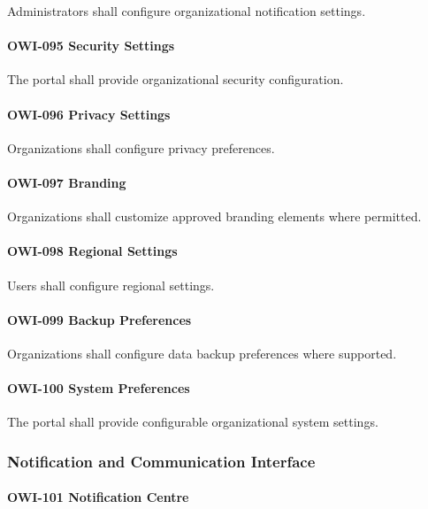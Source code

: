 Administrators shall configure organizational notification settings.

\paragraph{OWI-095 Security Settings}

The portal shall provide organizational security configuration.

\paragraph{OWI-096 Privacy Settings}

Organizations shall configure privacy preferences.

\paragraph{OWI-097 Branding}

Organizations shall customize approved branding elements where
permitted.

\paragraph{OWI-098 Regional Settings}

Users shall configure regional settings.

\paragraph{OWI-099 Backup Preferences}

Organizations shall configure data backup preferences where supported.

\paragraph{OWI-100 System Preferences}

The portal shall provide configurable organizational system settings.


\subsubsection*{Notification and Communication Interface}

\paragraph{OWI-101 Notification Centre}

